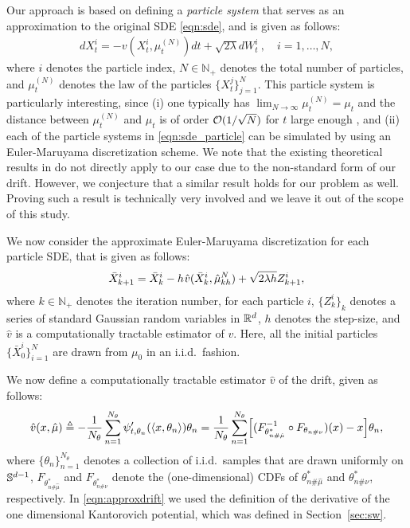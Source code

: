 Our approach is based on defining a \emph{particle system} that serves as an approximation to the original SDE \eqref{eqn:sde}, and is given as follows:
\begin{align}
d X_t^i = - v(X_t^i, \mu_t^{(N)}) dt + \sqrt{2 \lambda } d W_t^i \> , \quad i = 1,\dots, N, \label{eqn:sde_particle}
\end{align}
where $i$ denotes the particle index, $N \in \mathbb{N}_+$ denotes the total number of particles, and $\mu_t^{(N)}$ denotes the law of the particles $\{X_t^j\}_{j=1}^N$. This particle system is particularly interesting, since (i) one typically has $\lim_{N \rightarrow \infty} \mu_t^{(N)}= \mu_t $ and the distance between $\mu_t^{(N)}$ and $\mu_t$ is of order ${\cal O}(1/\sqrt{N})$ for $t$ large enough \cite{malrieu03,cgm-08}, and (ii) each of the particle systems in \eqref{eqn:sde_particle} can be simulated by using an Euler-Maruyama discretization scheme. We note that the existing theoretical results in \cite{veretennikov2006ergodic,mishura2016existence} do not directly apply to our case due to the non-standard form of our drift. However, we conjecture that a similar result holds for our problem as well. Proving such a result is technically very involved and we leave it out of the scope of this study. %

We now consider the approximate Euler-Maruyama discretization for each particle SDE, that is given as follows:
\begin{align}
\bar{X}^i_{k+1} = \bar{X}^i_k - h \hspace{0.5pt} \hat{v}(\bar{X}^i_k, \hat{\mu}_{kh}^N ) + \sqrt{2 \lambda h} Z^i_{k+1},
\end{align}
where $k \in \mathbb{N}_+$ denotes the iteration number, for each particle $i$, $\{Z^i_k\}_{k}$ denotes a series of standard Gaussian random variables in $\mathbb{R}^d$, $h$ denotes the step-size, and $\hat{v}$ is a computationally tractable estimator of $v$. Here, all the initial particles $\{\bar{X}_0^i\}_{i=1}^N$ are drawn from $\mu_0$ in an i.i.d.\ fashion.

We now define a computationally tractable estimator $\hat{v}$ of the drift, given as follows:
\begin{align}
\hat{v}(x,\hat{\mu}) \triangleq - \frac1{N_\theta} \sum_{n=1}^{N_\theta} \psi_{t, \theta_n}'(\langle x , \theta_n \rangle ) \theta_n = \frac1{N_\theta} \sum_{n=1}^{N_\theta} \Bigl[ (F_{\theta_{n\#\hat{\mu}}^*}^{-1} \circ F_{\theta_{n\#\nu}}) (x) - x \Bigr] \theta_n , \label{eqn:approxdrift}
\end{align}
where $\{\theta_n\}_{n=1}^{N_\theta}$ denotes a collection of i.i.d.\ samples that are drawn uniformly on $\mathbb{S}^{d-1}$, $F_{\theta_{n\#\hat{\mu}}^*}$ and $F_{\theta_{n\#\nu}^*}$ denote the (one-dimensional) CDFs of $\theta_{n\#\hat{\mu}}^*$ and $\theta_{n\#\nu}^*$, respectively. In \eqref{eqn:approxdrift} we used the definition of the derivative of the one dimensional Kantorovich potential, which was defined in Section~\ref{sec:sw}. 


